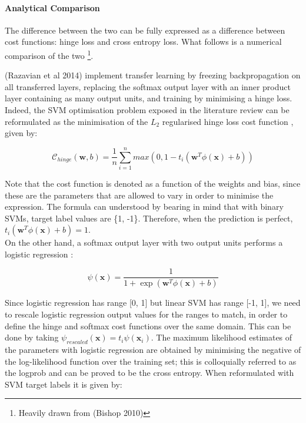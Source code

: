 \documentclass[a4paper,11pt]{article}
\begin{document}
\paragraph{Analytical Comparison}
The difference between the two can be fully expressed as a difference between cost functions\cite{ML-book}: hinge loss and cross entropy loss. What follows is a numerical comparison of the two \footnote{Heavily drawn from (Bishop 2010)}. 

(Razavian et al 2014) implement transfer learning by freezing backpropagation on all transferred layers, replacing the softmax output layer with an inner product layer containing as many output units, and training by minimising a hinge loss. Indeed, the SVM optimisation problem exposed in the literature review can be reformulated as the minimisation of the $L_2$ regularised hinge loss cost function \cite{ML-book}, given by:

\begin{equation}
\mathcal{C}_{hinge}(\textbf{w}, b) = \frac{1}{n}\sum \limits_{i=1}^{n} max(0, 1 - t_i(\textbf{w}^T \phi(\textbf{x}) + b))
\end{equation}

Note that the cost function is denoted as a function of the weights and bias, since these are the parameters that are allowed to vary in order to minimise the expression. The formula can understood by bearing in mind that with binary SVMs, target label values are \{1, -1\}. Therefore, when the prediction is perfect, $t_i(\textbf{w}^T \phi(\textbf{x}) + b) = 1$.\\

On the other hand, a softmax output layer with two output units performs a logistic regression \cite{ML-book}:

\begin{equation}
\psi(\textbf{x}) = \frac{1}{1+\exp(\textbf{w}^T \phi(\textbf{x}) + b)}
\end{equation}

Since logistic regression has range [0, 1] but linear SVM has range [-1, 1], we need to rescale logistic regression output values for the ranges to match, in order to define the hinge and softmax cost functions over the same domain. This can be done by taking $\psi_{rescaled}(\textbf{x}) = t_i \psi(\textbf{x}_i)$. The maximum likelihood estimates of the parameters with logistic regression are obtained by minimising the negative of the log-likelihood function over the training set; this is colloquially referred to as the logprob and can be proved to be the cross entropy. When reformulated with SVM target labels it is given by: 
\end{document}
